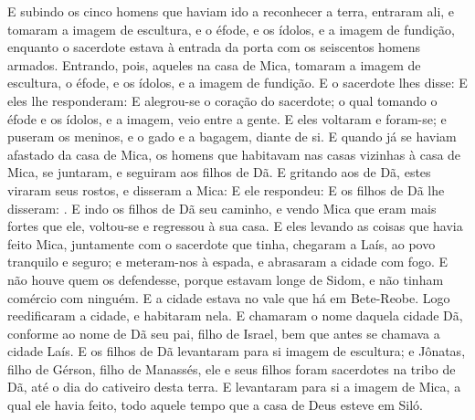 {  E subindo os cinco homens que haviam ido a reconhecer a terra, entraram ali, e tomaram a imagem de escultura, e o éfode, e os ídolos, e a imagem de fundição, enquanto o sacerdote estava à entrada da porta com os seiscentos homens armados. %
  Entrando, pois, aqueles na casa de Mica, tomaram a imagem de escultura, o éfode, e os ídolos, e a imagem de fundição. E o sacerdote lhes disse: 
  E eles lhe responderam: 
  E alegrou-se o coração do sacerdote; o qual tomando o éfode e os ídolos, e a imagem, veio entre a gente.
  E eles voltaram e foram-se; e puseram os meninos, e o gado e a bagagem, diante de si.
  E quando já se haviam afastado da casa de Mica, os homens que habitavam nas casas vizinhas à casa de Mica, se juntaram, e seguiram aos filhos de Dã.
  E gritando aos de Dã, estes viraram seus rostos, e disseram a Mica: 
  E ele respondeu: 
  E os filhos de Dã lhe disseram: .
  E indo os filhos de Dã seu caminho, e vendo Mica que eram mais fortes que ele, voltou-se e regressou à sua casa.
  E eles levando as coisas que havia feito Mica, juntamente com o sacerdote que tinha, chegaram a Laís, ao povo tranquilo e seguro; e meteram-nos à espada, e abrasaram a cidade com fogo.
  E não houve quem os defendesse, porque estavam longe de Sidom, e não tinham comércio com ninguém. E a cidade estava no vale que há em Bete-Reobe. Logo reedificaram a cidade, e habitaram nela.
  E chamaram o nome daquela cidade Dã, conforme ao nome de Dã seu pai, filho de Israel, bem que antes se chamava a cidade Laís.
  E os filhos de Dã levantaram para si imagem de escultura; e Jônatas, filho de Gérson, filho de Manassés, ele e seus filhos foram sacerdotes na tribo de Dã, até o dia do cativeiro desta terra.
  E levantaram para si a imagem de Mica, a qual ele havia feito, todo aquele tempo que a casa de Deus esteve em Siló.
\par }

